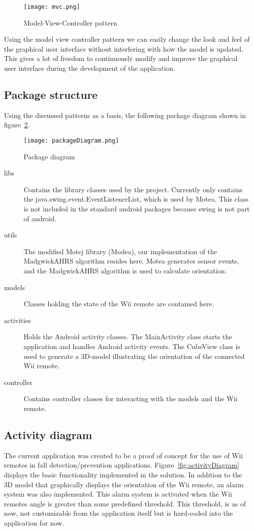 \begin{figure}[h!]
  \centering
    \texttt{[image: mvc.png]}
    \caption{\footnotesize Model-View-Controller pattern}
    \label{fig:mvc}
\end{figure}

Using the model view controller pattern we can easily change the look and feel of the graphical user interface without interfering with how the model is updated. This gives a lot of freedom to continuously modify and improve the graphical user interface during the development of the application. 

\subsection{Package structure}
Using the discussed patterns as a basis, the following package diagram shown in figure~\ref{fig:packageDiagram}. 

\begin{figure}[h!]
  \centering
    \texttt{[image: packageDiagram.png]}
    \caption{\footnotesize Package diagram}
    \label{fig:packageDiagram}
\end{figure}

\begin{description}
	\item[libs] Contains the library classes used by the project. Currently only contains the java.swing.event.EventListenerList, which is used by Motea. This class is not included in the standard android packages because swing is not part of android.
	\item[utils] The modified Motej library (Modea), our implementation of the MadgwickAHRS algorithm resides here. Motea generates sensor events, and the MadgwickAHRS algorithm is used to calculate orientation.
	\item[models] Classes holding the state of the Wii remote are contained here.
	\item[activities] Holds the Android activity classes. The MainActivity class starts the application and handles Android activity events. The CubeView class is used to generate a 3D-model illustrating the orientation of the connected Wii remote.
	\item[controller] Contains controller classes for interacting with the models and the Wii remote.
\end{description}

\subsection{Activity diagram}
The current application was created to be a proof of concept for the use of Wii remotes in fall detection/prevention applications. Figure~\ref{fig:activityDiagram} displays the basic functionality implemented in the solution. In addition to the 3D model that graphically displays the orientation of the Wii remote, an alarm system was also implemented. This alarm system is activated when the Wii remotes angle is greater than some predefined threshold. This threshold, is as of now, not customizable from the application itself but is hard-coded  into the application for now. 

